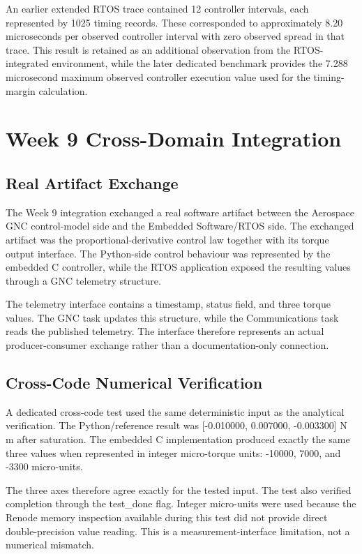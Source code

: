 \documentclass[11pt,a4paper]{article}
\begin{document}
An earlier extended RTOS trace contained 12 controller intervals, each represented by 1025 timing records. These corresponded to approximately 8.20 microseconds per observed controller interval with zero observed spread in that trace. This result is retained as an additional observation from the RTOS-integrated environment, while the later dedicated benchmark provides the 7.288 microsecond maximum observed controller execution value used for the timing-margin calculation.


\section{Week 9 Cross-Domain Integration}

\subsection{Real Artifact Exchange}

The Week 9 integration exchanged a real software artifact between the Aerospace GNC control-model side and the Embedded Software/RTOS side. The exchanged artifact was the proportional-derivative control law together with its torque output interface. The Python-side control behaviour was represented by the embedded C controller, while the RTOS application exposed the resulting values through a GNC telemetry structure.

The telemetry interface contains a timestamp, status field, and three torque values. The GNC task updates this structure, while the Communications task reads the published telemetry. The interface therefore represents an actual producer-consumer exchange rather than a documentation-only connection.

\subsection{Cross-Code Numerical Verification}

A dedicated cross-code test used the same deterministic input as the analytical verification. The Python/reference result was [-0.010000, 0.007000, -0.003300] N m after saturation. The embedded C implementation produced exactly the same three values when represented in integer micro-torque units: -10000, 7000, and -3300 micro-units.

The three axes therefore agree exactly for the tested input. The test also verified completion through the test_done flag. Integer micro-units were used because the Renode memory inspection available during this test did not provide direct double-precision value reading. This is a measurement-interface limitation, not a numerical mismatch.
\end{document}
